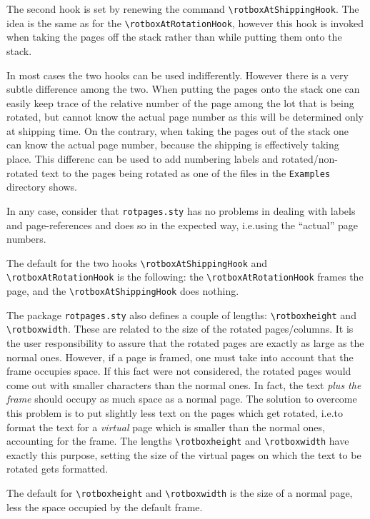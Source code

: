 \documentclass[12pt,twocolumn]{article}
\begin{document}
The second hook is set by renewing the command
\verb|\rotboxAtShippingHook|. The idea is the same as for the
\verb|\rotboxAtRotationHook|, however this hook is invoked when taking
the pages off the stack rather than while putting them onto the stack.

In most cases the two hooks can be used indifferently. However there
is a very subtle difference among the two. When putting the pages onto
the stack one can easily keep trace of the relative number of the page
among the lot that is being rotated, but cannot know the actual page
number as this will be determined only at shipping time. On the
contrary, when taking the pages out of the stack one can know the
actual page number, because the shipping is effectively taking place.
This differenc can be used to add numbering labels and
rotated/non-rotated text to the pages being rotated as one of the
files in the \texttt{Examples} directory shows.

In any case, consider that \texttt{rotpages.sty} has no problems in
dealing with labels and page-references and does so in the expected
way, i.e.\@ using the ``actual'' page numbers.

The default for the two hooks \verb|\rotboxAtShippingHook| and
\verb|\rotboxAtRotationHook| is the following: the
\verb|\rotboxAtRotationHook| frames the page, and the
\verb|\rotboxAtShippingHook| does nothing.

The package \texttt{rotpages.sty} also defines a couple of lengths:
\verb|\rotboxheight| and \verb|\rotboxwidth|. These are related to the
size of the rotated pages/columns. It is the user responsibility to
assure that the rotated pages are exactly as large as the normal ones.
However, if a page is framed, one must take into account that the
frame occupies space. If this fact were not considered, the rotated
pages would come out with smaller characters than the normal ones. In
fact, the text \emph{plus the frame} should occupy as much space as a
normal page. The solution to overcome this problem is to put slightly
less text on the pages which get rotated, i.e.\@ to format the text
for a \emph{virtual} page which is smaller than the normal ones,
accounting for the frame. The lengths \verb|\rotboxheight| and
\verb|\rotboxwidth| have exactly this purpose, setting the size of the
virtual pages on which the text to be rotated gets formatted.

The default for \verb|\rotboxheight| and \verb|\rotboxwidth| is the
size of a normal page, less the space occupied by the default frame.
\end{document}
